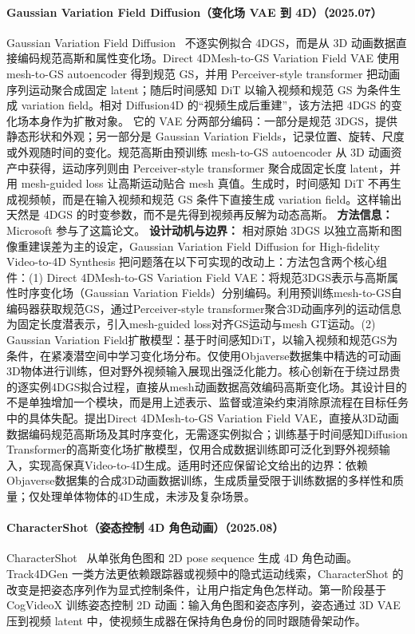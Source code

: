 \paragraph{Gaussian Variation Field Diffusion（变化场 VAE 到 4D）（2025.07）}
Gaussian Variation Field Diffusion~\cite{2507_23785} 不逐实例拟合 4DGS，而是从 3D 动画数据直接编码规范高斯和属性变化场。Direct 4DMesh-to-GS Variation Field VAE 使用 mesh-to-GS autoencoder 得到规范 GS，并用 Perceiver-style transformer 把动画序列运动聚合成固定 latent；随后时间感知 DiT 以输入视频和规范 GS 为条件生成 variation field。相对 Diffusion4D 的“视频生成后重建”，该方法把 4DGS 的变化场本身作为扩散对象。
它的 VAE 分两部分编码：一部分是规范 3DGS，提供静态形状和外观；另一部分是 Gaussian Variation Fields，记录位置、旋转、尺度或外观随时间的变化。规范高斯由预训练 mesh-to-GS autoencoder 从 3D 动画资产中获得，运动序列则由 Perceiver-style transformer 聚合成固定长度 latent，并用 mesh-guided loss 让高斯运动贴合 mesh 真值。生成时，时间感知 DiT 不再生成视频帧，而是在输入视频和规范 GS 条件下直接生成 variation field。这样输出天然是 4DGS 的时变参数，而不是先得到视频再反解为动态高斯。
\textbf{方法信息：} Microsoft 参与了这篇论文。
\textbf{设计动机与边界：} 相对原始 3DGS 以独立高斯和图像重建误差为主的设定，Gaussian Variation Field Diffusion for High-fidelity Video-to-4D Synthesis 把问题落在以下可实现的改动上：方法包含两个核心组件：(1) Direct 4DMesh-to-GS Variation Field VAE：将规范3DGS表示与高斯属性时序变化场（Gaussian Variation Fields）分别编码。利用预训练mesh-to-GS自编码器获取规范GS，通过Perceiver-style transformer聚合3D动画序列的运动信息为固定长度潜表示，引入mesh-guided loss对齐GS运动与mesh GT运动。(2) Gaussian Variation Field扩散模型：基于时间感知DiT，以输入视频和规范GS为条件，在紧凑潜空间中学习变化场分布。仅使用Objaverse数据集中精选的可动画3D物体进行训练，但对野外视频输入展现出强泛化能力。核心创新在于绕过昂贵的逐实例4DGS拟合过程，直接从mesh动画数据高效编码高斯变化场。其设计目的不是单独增加一个模块，而是用上述表示、监督或渲染约束消除原流程在目标任务中的具体失配。提出Direct 4DMesh-to-GS Variation Field VAE，直接从3D动画数据编码规范高斯场及其时序变化，无需逐实例拟合；训练基于时间感知Diffusion Transformer的高斯变化场扩散模型，仅用合成数据训练即可泛化到野外视频输入，实现高保真Video-to-4D生成。适用时还应保留论文给出的边界：依赖Objaverse数据集的合成3D动画数据训练，生成质量受限于训练数据的多样性和质量；仅处理单体物体的4D生成，未涉及复杂场景。
\paragraph{CharacterShot（姿态控制 4D 角色动画）（2025.08）}
CharacterShot~\cite{2508_07409} 从单张角色图和 2D pose sequence 生成 4D 角色动画。Track4DGen 一类方法更依赖跟踪器或视频中的隐式运动线索，CharacterShot 的改变是把姿态序列作为显式控制条件，让用户指定角色怎样动。第一阶段基于 CogVideoX 训练姿态控制 2D 动画：输入角色图和姿态序列，姿态通过 3D VAE 压到视频 latent 中，使视频生成器在保持角色身份的同时跟随骨架动作。

